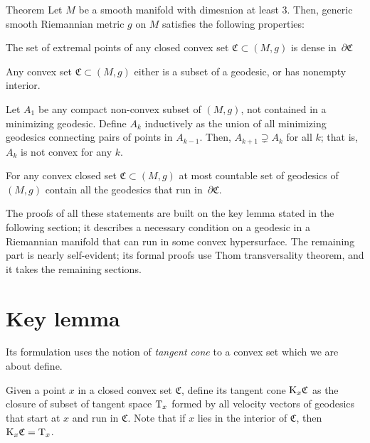 \documentclass[a4paper,10pt]{article}
\begin{document}
\begin{thm}{Theorem}
Let $M$ be a smooth manifold with dimesnion at least 3.
Then, generic smooth Riemannian metric $g$ on $M$ satisfies the following properties:

\begin{subthm}{}
The set of extremal points of any closed convex set $\mathfrak{C}\subset (M,g)$ is dense in~$\partial\mathfrak{C}$
\end{subthm}

\begin{subthm}{}
Any convex set $\mathfrak{C}\subset (M,g)$ either is a subset of a geodesic, or has nonempty interior.
\end{subthm}


\begin{subthm}{}
Let $A_1$ be any compact non-convex  subset of $(M,g)$, not contained in a minimizing  geodesic. Define  $A_k$ inductively as  the union of all minimizing geodesics connecting pairs of  points in 
$A_{k-1}$.
Then, $A_{k+1}\supsetneq A_k$ for all $k$;
that is, $A_k$ is not convex for any $k$.
\end{subthm}


\begin{subthm}{}
For any convex closed set $\mathfrak{C}\subset (M,g)$ at most countable set of geodesics of $(M,g)$ contain all the geodesics that run in~$\partial\mathfrak{C}$.
\end{subthm}
\end{thm}

The proofs of all these statements are built on the key lemma stated in the following section; 
it describes a necessary condition on a geodesic in a Riemannian manifold that can run in some convex hypersurface.
The remaining part is nearly self-evident;
its formal proofs use Thom transversality theorem, and it takes the remaining sections.

\section{Key lemma}


Its formulation uses the notion of \emph{tangent cone} to a convex set which we are about define.

Given a point $x$ in a closed convex set $\mathfrak{C}$, define its tangent cone $\mathrm{K}_x\mathfrak{C}$ as the closure of subset of tangent space $\mathrm{T}_x$ formed by all velocity vectors of geodesics that start at $x$ and run in $\mathfrak{C}$.
Note that if $x$ lies in the interior of $\mathfrak{C}$, then $\mathrm{K}_x\mathfrak{C}=\mathrm{T}_x$.
\end{document}
